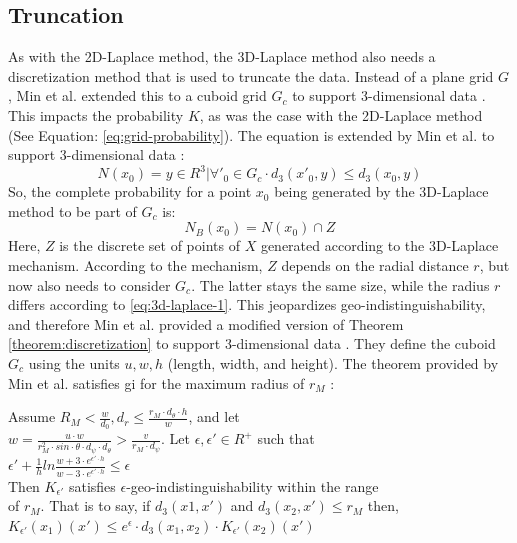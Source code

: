 \newpage
\subsection{Truncation}
As with the 2D-Laplace method, the 3D-Laplace method also needs a discretization method that is used to truncate the data.
Instead of a plane grid $G$, Min et al. extended this to a cuboid grid $G_c$ to support 3-dimensional data \citep{9646489}.
This impacts the probability $K$, as was the case with the 2D-Laplace method (See Equation: \ref{eq:grid-probability}).
The equation is extended by Min et al. to support 3-dimensional data \citep{9646489}:
\begin{equation}
  N(x_0) = { y \in R^3 | \forall'_{0} \in G_c \cdot d_3(x'_{0}, y) \leq d_3(x_0, y)}
  \label{eq:3d-grid-probability}
\end{equation}
So, the complete probability for a point $x_0$ being generated by the 3D-Laplace method to be part of $G_c$ is:
\begin{equation}
  N_B(x_0) = N(x_0) \cap Z
  \label{eq:3d-grid-probability-2}
\end{equation}
Here, $Z$ is the discrete set of points of $X$ generated according to the 3D-Laplace mechanism.
According to the mechanism, $Z$ depends on the radial distance $r$, but now also needs to consider $G_c$.
The latter stays the same size, while the radius $r$ differs according to \ref{eq:3d-laplace-1}.
This jeopardizes geo-indistinguishability, and therefore Min et al. provided a modified version of Theorem \ref{theorem:discretization} to support 3-dimensional data \citep{9646489}.
They define the cuboid $G_c$ using the units $u, w, h$ (length, width, and height).
The theorem provided by Min et al. satisfies \gls{gi} for the maximum radius of $r_M$ \citep{9646489}:
\begin{theorem}
  Assume $R_M < \frac{w}{d_0}, d_r \leq \frac{r_M \cdot d_\theta \cdot h}{w}$, and let \\
  $w = \frac{u \cdot w}{r^2_M \cdot sin \cdot \theta \cdot d_\psi \cdot d_\theta} > \frac{v}{r_M \cdot d_\psi}$. Let $\epsilon, \epsilon' \in R^+$ such that \\
  $\epsilon' + \frac{1}{h} ln \frac{w + 3 \cdot e^{\epsilon' \cdot h}}{w - 3 \cdot e^{\epsilon' \cdot h}} \leq \epsilon$ \\
  Then $K_{\epsilon'}$ satisfies $\epsilon$-geo-indistinguishability within the range \\
  of $r_M$. That is to say, if $d_3(x1, x')$ and $d_3(x_2, x') \leq r_M$ then, \\
  $K_{\epsilon'}(x_1)(x') \leq e^\epsilon \cdot d_3(x_1, x_2) \cdot K_{\epsilon'}(x_2)(x')$
  \label{theorem:3d-discretization}
\end{theorem}
